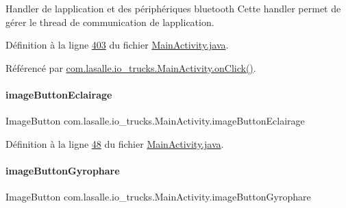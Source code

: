 Handler de l\textquotesingle{}application et des périphériques bluetooth Cette handler permet de gérer le thread de communication de l\textquotesingle{}application. 



Définition à la ligne \hyperlink{_main_activity_8java_source_l00403}{403} du fichier \hyperlink{_main_activity_8java_source}{Main\+Activity.\+java}.



Référencé par \hyperlink{_main_activity_8java_source_l00131}{com.\+lasalle.\+io\+\_\+trucks.\+Main\+Activity.\+on\+Click()}.

\mbox{\label{classcom_1_1lasalle_1_1io__trucks_1_1_main_activity_a1cc3f48aebca6c187b2a964fa6f569fc}} 
\paragraph{\texorpdfstring{image\+Button\+Eclairage}{imageButtonEclairage}}
{\footnotesize\ttfamily Image\+Button com.\+lasalle.\+io\+\_\+trucks.\+Main\+Activity.\+image\+Button\+Eclairage\hspace{0.3cm}{\ttfamily [private]}}



Définition à la ligne \hyperlink{_main_activity_8java_source_l00048}{48} du fichier \hyperlink{_main_activity_8java_source}{Main\+Activity.\+java}.

\mbox{\label{classcom_1_1lasalle_1_1io__trucks_1_1_main_activity_aed3dc707e8acf48e821ebda3312a0dca}} 
\paragraph{\texorpdfstring{image\+Button\+Gyrophare}{imageButtonGyrophare}}
{\footnotesize\ttfamily Image\+Button com.\+lasalle.\+io\+\_\+trucks.\+Main\+Activity.\+image\+Button\+Gyrophare\hspace{0.3cm}{\ttfamily [private]}}



